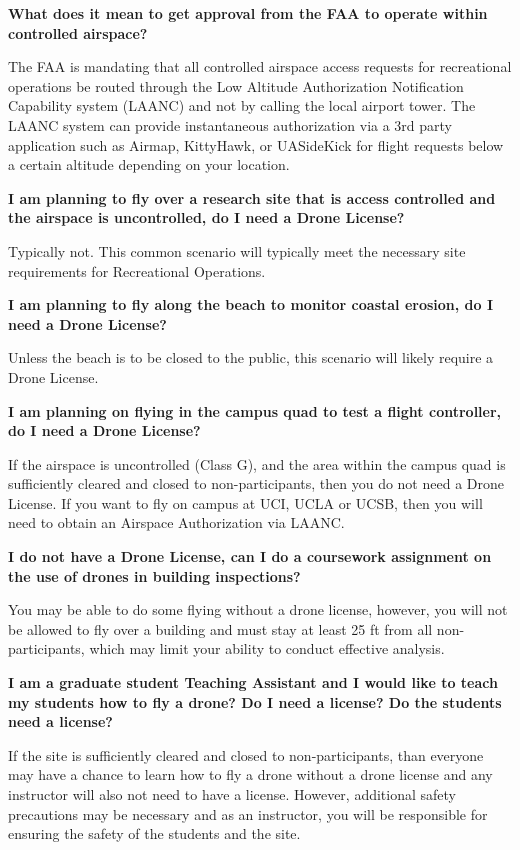 \documentclass[
]{book}
\begin{document}
\textbf{What does it mean to get approval from the FAA to operate within controlled airspace?}

The FAA is mandating that all controlled airspace access requests for recreational operations be routed through the Low Altitude Authorization Notification Capability system (LAANC) and not by calling the local airport tower. The LAANC system can provide instantaneous authorization via a 3rd party application such as Airmap, KittyHawk, or UASideKick for flight requests below a certain altitude depending on your location.

\textbf{I am planning to fly over a research site that is access controlled and the airspace is uncontrolled, do I need a Drone License?}

Typically not. This common scenario will typically meet the necessary site requirements for Recreational Operations.

\textbf{I am planning to fly along the beach to monitor coastal erosion, do I need a Drone License?}

Unless the beach is to be closed to the public, this scenario will likely require a Drone License.

\textbf{I am planning on flying in the campus quad to test a flight controller, do I need a Drone License?}

If the airspace is uncontrolled (Class G), and the area within the campus quad is sufficiently cleared and closed to non-participants, then you do not need a Drone License. If you want to fly on campus at UCI, UCLA or UCSB, then you will need to obtain an Airspace Authorization via LAANC.

\textbf{I do not have a Drone License, can I do a coursework assignment on the use of drones in building inspections?}

You may be able to do some flying without a drone license, however, you will not be allowed to fly over a building and must stay at least 25 ft from all non-participants, which may limit your ability to conduct effective analysis.

\textbf{I am a graduate student Teaching Assistant and I would like to teach my students how to fly a drone? Do I need a license? Do the students need a license?}

If the site is sufficiently cleared and closed to non-participants, than everyone may have a chance to learn how to fly a drone without a drone license and any instructor will also not need to have a license. However, additional safety precautions may be necessary and as an instructor, you will be responsible for ensuring the safety of the students and the site.
\end{document}
